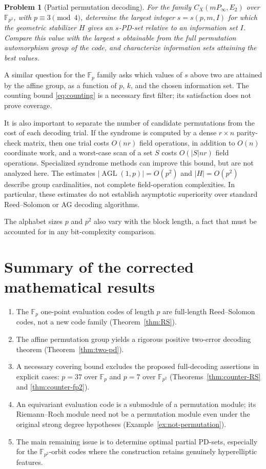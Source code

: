 \documentclass[12pt]{article}
\newtheorem{problem}[theorem]{Problem}
\numberwithin{equation}{section}
\newcommand{\F}{\mathbb{F}}
\newcommand{\AGL}{\operatorname{AGL}}
\begin{document}
\begin{problem}[Partial permutation decoding]
\label{conj:partial}
For the family $C_X(mP_\infty,E_2)$ over $\F_{p^2}$,
with $p\equiv3\pmod4$, determine the largest
integer $s=s(p,m,I)$ for which the geometric stabilizer
$H$ gives an $s$-PD-set relative to an information set $I$.
Compare this value with the largest $s$ obtainable from
the full permutation automorphism group of the code, and
characterize information sets attaining the best values.
\end{problem}

A similar question for the $\F_p$ family asks which values
of $s$ above two are attained by the affine group, as a
function of $p$, $k$, and the chosen information set.
The counting bound \eqref{eq:counting} is a necessary
first filter; its satisfaction does not prove coverage.

It is also important to separate the number of candidate
permutations from the cost of each decoding trial.
If the syndrome is computed by a dense $r\times n$
parity-check matrix, then one trial costs
$O(nr)$ field operations, in addition to $O(n)$
coordinate work, and a worst-case scan of a set $S$
costs $O(|S|nr)$ field operations.  Specialized
syndrome methods can improve this bound, but are not
analyzed here.  The estimates $|\AGL(1,p)|=O(p^2)$
and $|H|=O(p^2)$ describe group cardinalities, not
complete field-operation complexities.  In particular,
these estimates do not establish asymptotic superiority
over standard Reed--Solomon or AG decoding algorithms.

The alphabet sizes $p$ and $p^2$ also vary with the
block length, a fact that must be accounted for in
any bit-complexity comparison.

\section{Summary of the corrected mathematical results}
\begin{enumerate}
\item The $\F_p$ one-point evaluation codes of length $p$
are full-length Reed--Solomon codes, not a new code family
(Theorem~\ref{thm:RS}).
\item The affine permutation group yields a rigorous
positive two-error decoding theorem
(Theorem~\ref{thm:two-pd}).
\item A necessary covering bound excludes the proposed
full-decoding assertions in explicit cases:
$p=37$ over $\F_p$ and $p=7$ over $\F_{p^2}$
(Theorems~\ref{thm:counter-RS} and
\ref{thm:counter-fp2}).
\item An equivariant evaluation code is a submodule of a
permutation module; its Riemann--Roch module need not be
a permutation module even under the original strong degree
hypotheses (Example~\ref{ex:not-permutation}).
\item The main remaining issue is to determine optimal
partial PD-sets, especially for the $\F_{p^2}$-orbit
codes where the construction retains genuinely
hyperelliptic features.
\end{enumerate}
\end{document}
